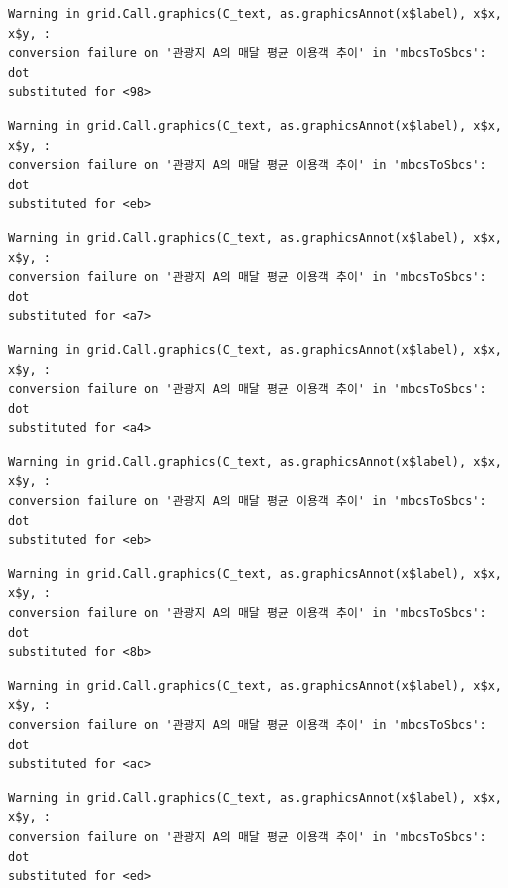 \documentclass[
  letterpaper,
  DIV=11,
  numbers=noendperiod]{scrreprt}
\begin{document}
\begin{verbatim}
Warning in grid.Call.graphics(C_text, as.graphicsAnnot(x$label), x$x, x$y, :
conversion failure on '관광지 A의 매달 평균 이용객 추이' in 'mbcsToSbcs': dot
substituted for <98>
\end{verbatim}

\begin{verbatim}
Warning in grid.Call.graphics(C_text, as.graphicsAnnot(x$label), x$x, x$y, :
conversion failure on '관광지 A의 매달 평균 이용객 추이' in 'mbcsToSbcs': dot
substituted for <eb>
\end{verbatim}

\begin{verbatim}
Warning in grid.Call.graphics(C_text, as.graphicsAnnot(x$label), x$x, x$y, :
conversion failure on '관광지 A의 매달 평균 이용객 추이' in 'mbcsToSbcs': dot
substituted for <a7>
\end{verbatim}

\begin{verbatim}
Warning in grid.Call.graphics(C_text, as.graphicsAnnot(x$label), x$x, x$y, :
conversion failure on '관광지 A의 매달 평균 이용객 추이' in 'mbcsToSbcs': dot
substituted for <a4>
\end{verbatim}

\begin{verbatim}
Warning in grid.Call.graphics(C_text, as.graphicsAnnot(x$label), x$x, x$y, :
conversion failure on '관광지 A의 매달 평균 이용객 추이' in 'mbcsToSbcs': dot
substituted for <eb>
\end{verbatim}

\begin{verbatim}
Warning in grid.Call.graphics(C_text, as.graphicsAnnot(x$label), x$x, x$y, :
conversion failure on '관광지 A의 매달 평균 이용객 추이' in 'mbcsToSbcs': dot
substituted for <8b>
\end{verbatim}

\begin{verbatim}
Warning in grid.Call.graphics(C_text, as.graphicsAnnot(x$label), x$x, x$y, :
conversion failure on '관광지 A의 매달 평균 이용객 추이' in 'mbcsToSbcs': dot
substituted for <ac>
\end{verbatim}

\begin{verbatim}
Warning in grid.Call.graphics(C_text, as.graphicsAnnot(x$label), x$x, x$y, :
conversion failure on '관광지 A의 매달 평균 이용객 추이' in 'mbcsToSbcs': dot
substituted for <ed>
\end{verbatim}
\end{document}
